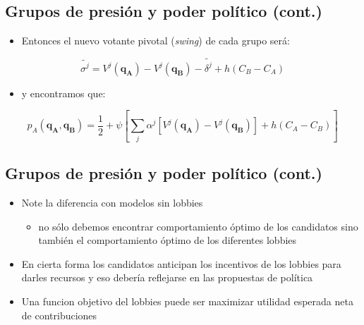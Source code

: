 \documentclass[
  letterpaper,
  DIV=11,
  numbers=noendperiod]{scrartcl}
\providecommand{\tightlist}{%
  \setlength{\itemsep}{0pt}\setlength{\parskip}{0pt}}\usepackage{longtable,booktabs,array}
\begin{document}
\subsection{Grupos de presión y poder político
(cont.)}\label{grupos-de-presiuxf3n-y-poder-poluxedtico-cont.-2}

\begin{itemize}
\tightlist
\item
  Entonces el nuevo votante pivotal (\emph{swing}) de cada grupo será:
\end{itemize}

\begin{equation}
\tilde{\sigma^{j}}=V^{j}(\mathbf{q_{A}})-V^{j}(\mathbf{q_{B}})-\tilde{\delta^{j}}+h(C_{B}-C_{A})
\end{equation}

\begin{itemize}
\tightlist
\item
  y encontramos que:
\end{itemize}

\begin{equation}
    p_{A}(\mathbf{q_{A}},\mathbf{q_{B}})=\frac{1}{2}+\psi
    \left[\sum_{j}
    \alpha^{j}[V^{j}(\mathbf{q_{A}})-V^{j}(\mathbf{q_{B}})]+h(C_{A}-C_{B})\right]
\end{equation}

\subsection{Grupos de presión y poder político
(cont.)}\label{grupos-de-presiuxf3n-y-poder-poluxedtico-cont.-3}

\begin{itemize}
\tightlist
\item
  Note la diferencia con modelos sin lobbies

  \begin{itemize}
  \tightlist
  \item
    no sólo debemos encontrar comportamiento óptimo de los candidatos
    sino también el comportamiento óptimo de los diferentes lobbies
  \end{itemize}
\item
  En cierta forma los candidatos anticipan los incentivos de los lobbies
  para darles recursos y eso debería reflejarse en las propuestas de
  política
\item
  Una funcion objetivo del lobbies puede ser maximizar utilidad esperada
  neta de contribuciones
\end{itemize}
\end{document}
